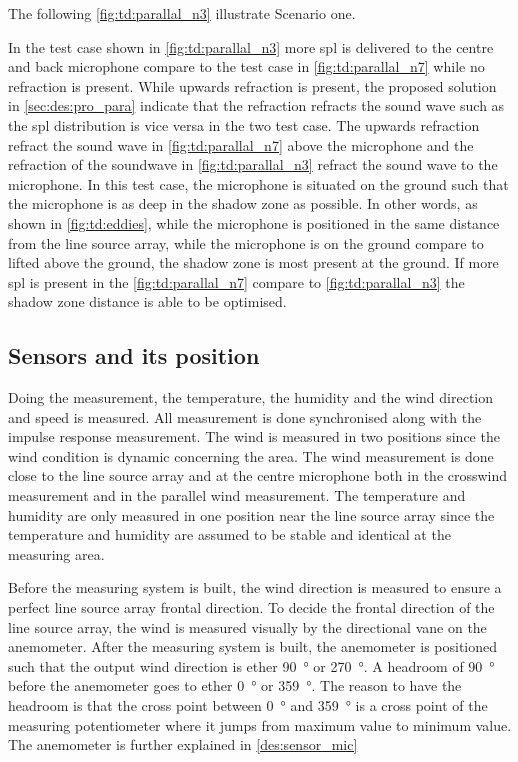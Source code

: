  The following \autoref{fig:td:parallal_n3} illustrate Scenario one.


In the test case shown in \autoref{fig:td:parallal_n3} more \gls{spl} is delivered to the centre and back microphone compare to the test case in  \autoref{fig:td:parallal_n7} while no refraction is present. While upwards refraction is present, the proposed solution in \autoref{sec:des:pro_para} indicate that the refraction refracts the sound wave such as the \gls{spl} distribution is vice versa in the two test case. The upwards refraction refract the sound wave in \autoref{fig:td:parallal_n7} above the microphone and the refraction of the soundwave in \autoref{fig:td:parallal_n3} refract the sound wave to the microphone.
In this test case, the microphone is situated on the ground such that the microphone is as deep in the shadow zone as possible. In other words, as shown in \autoref{fig:td:eddies}, while the microphone is positioned in the same distance from the line source array, while the microphone is on the ground compare to lifted above the ground, the shadow zone is most present at the ground. If more \gls{spl} is present in the \autoref{fig:td:parallal_n7} compare to \autoref{fig:td:parallal_n3} the shadow zone distance is able to be optimised.

\subsection{Sensors and its position}
Doing the measurement, the temperature, the humidity and the wind direction and speed is measured. All measurement is done synchronised along with the impulse response measurement. The wind is measured in two positions since the wind condition is dynamic concerning the area. The wind measurement is done close to the line source array and at the centre microphone both in the crosswind measurement and in the parallel wind measurement. The temperature and humidity are only measured in one position near the line source array since the temperature and humidity are assumed to be stable and identical at the measuring area. 

Before the measuring system is built, the wind direction is measured to ensure a perfect line source array frontal direction. To decide the frontal direction of the line source array, the wind is measured visually by the directional vane on the anemometer. After the measuring system is built, the anemometer is positioned such that the output wind direction is ether \SI{90}{\degree} or \SI{270}{\degree}. A headroom of \SI{90}{\degree} before the anemometer goes to ether \SI{0}{\degree} or \SI{359}{\degree}. The reason to have the headroom is that the cross point between \SI{0}{\degree} and \SI{359}{\degree} is a cross point of the measuring potentiometer where it jumps from maximum value to minimum value. The anemometer is further explained in \autoref{des:sensor_mic}

